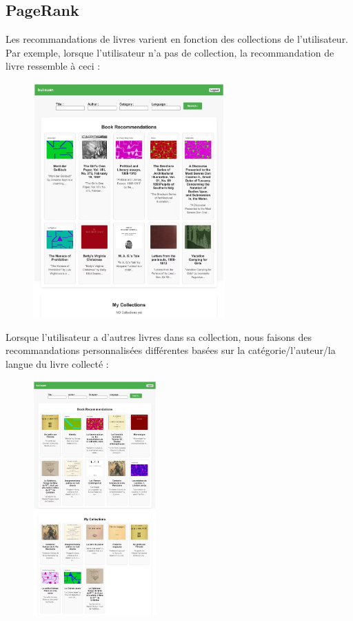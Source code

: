 \documentclass[11pt,english]{article}
\begin{document}
{    \indent 

    \subsection{PageRank}

    \indent

    Les recommandations de livres varient en fonction des collections de l'utilisateur. Par exemple, lorsque l'utilisateur n'a pas de collection, la recommandation de livre ressemble à ceci :
    
    \begin{figure}[H]
        \begin{center}
            \includegraphics[height=9cm]{./src/Rank1.jpg}
        \end{center}
    \end{figure}

    \indent Lorsque l'utilisateur a d'autres livres dans sa collection, nous faisons des recommandations personnalisées différentes basées sur la catégorie/l'auteur/la langue du livre collecté :

    \begin{figure}[H]
        \begin{center}
            \includegraphics[height=9cm]{./src/Rank3.jpg}
        \end{center}
    \end{figure}

}
\end{document}
